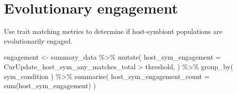 \documentclass[
]{book}
\newenvironment{Shaded}{\begin{snugshade}}{\end{snugshade}}
\newcommand{\AttributeTok}[1]{\textcolor[rgb]{0.77,0.63,0.00}{#1}}
\newcommand{\FunctionTok}[1]{\textcolor[rgb]{0.00,0.00,0.00}{#1}}
\newcommand{\NormalTok}[1]{#1}
\newcommand{\OtherTok}[1]{\textcolor[rgb]{0.56,0.35,0.01}{#1}}
\newcommand{\SpecialCharTok}[1]{\textcolor[rgb]{0.00,0.00,0.00}{#1}}
\begin{document}
\hypertarget{evolutionary-engagement-1}{%
\section{Evolutionary engagement}\label{evolutionary-engagement-1}}

Use trait matching metrics to determine if host-symbiont populations are evolutionarily engaged.

\begin{Shaded}
\begin{Highlighting}[]
\NormalTok{engagement }\OtherTok{\textless{}{-}}\NormalTok{ summary\_data }\SpecialCharTok{\%\textgreater{}\%}
  \FunctionTok{mutate}\NormalTok{(}
    \AttributeTok{host\_sym\_engagement =}\NormalTok{ CurUpdate\_host\_sym\_any\_matches\_total }\SpecialCharTok{\textgreater{}}\NormalTok{ threshold,}
\NormalTok{  ) }\SpecialCharTok{\%\textgreater{}\%}
  \FunctionTok{group\_by}\NormalTok{(}
\NormalTok{    sym\_condition}
\NormalTok{  ) }\SpecialCharTok{\%\textgreater{}\%}
  \FunctionTok{summarise}\NormalTok{(}
    \AttributeTok{host\_sym\_engagement\_count =} \FunctionTok{sum}\NormalTok{(host\_sym\_engagement)}
\NormalTok{  )}
\end{Highlighting}
\end{Shaded}
\end{document}
